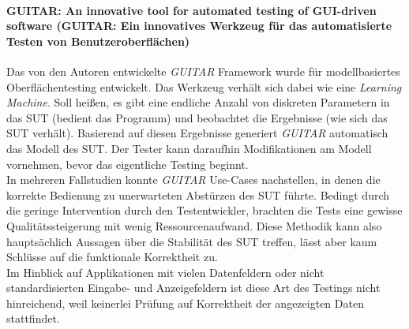 \paragraph{GUITAR: An innovative tool for automated testing of GUI-driven software  \cite{nguyen_guitar:_2014} (GUITAR: Ein innovatives Werkzeug für das automatisierte Testen von Benutzeroberflächen)} Das von den Autoren entwickelte \textit{GUITAR} Framework wurde für modellbasiertes Oberflächentesting entwickelt. Das Werkzeug verhält sich dabei wie eine \textit{Learning Machine}. Soll heißen, es gibt eine endliche Anzahl von diskreten Parametern in das \Gls{SUT} (bedient das Programm) und beobachtet die Ergebnisse (wie sich das \Gls{SUT} verhält). Basierend auf diesen Ergebnisse generiert \textit{GUITAR} automatisch das Modell des SUT. Der Tester kann daraufhin Modifikationen am Modell vornehmen, bevor das eigentliche Testing beginnt.\\ 
In mehreren Fallstudien konnte \textit{GUITAR} Use-Cases nachstellen, in denen die korrekte Bedienung zu unerwarteten Abstürzen des \Gls{SUT} führte. Bedingt durch die geringe Intervention durch den Testentwickler, brachten die Tests eine gewisse Qualitätssteigerung mit wenig Ressourcenaufwand. Diese Methodik kann also hauptsächlich Aussagen über die Stabilität des \Gls{SUT} treffen, lässt aber kaum Schlüsse auf die funktionale Korrektheit zu.\\
Im Hinblick auf Applikationen mit vielen Datenfeldern oder nicht standardisierten Eingabe- und Anzeigefeldern ist diese Art des Testings nicht hinreichend, weil keinerlei Prüfung auf Korrektheit der angezeigten Daten stattfindet.

